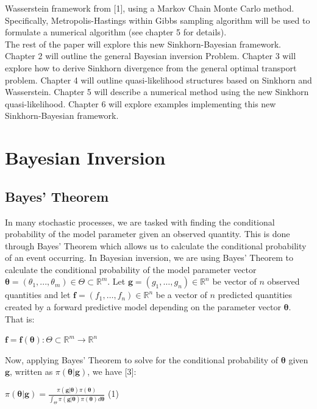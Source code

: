 \documentclass[botnum, fleqn]{unmeethesis}
\begin{document}
Wasserstein framework from [1], using a Markov Chain Monte Carlo method. Specifically, Metropolis-Hastings within Gibbs sampling algorithm will be used to formulate a numerical algorithm (see chapter 5 for details). \\
   The rest of the paper will explore this new Sinkhorn-Bayesian framework. Chapter 2 will outline the general Bayesian inversion Problem. Chapter 3 will explore how to derive Sinkhorn divergence from the general optimal transport problem. Chapter 4 will outline quasi-likelihood structures based on Sinkhorn and Wasserstein. Chapter 5 will describe a numerical method using the new Sinkhorn quasi-likelihood. Chapter 6 will explore examples implementing this new Sinkhorn-Bayesian framework. 
   

\chapter{Bayesian Inversion}
\section{\label{section:Bayes' Theorem}Bayes' Theorem}
In many stochastic processes, we are tasked with finding the conditional probability of the model parameter given an observed quantity. This is done through Bayes’ Theorem which allows us to calculate the conditional probability of an event occurring. In Bayesian inversion, we are using Bayes’ Theorem to calculate the conditional probability of the model parameter vector $\bm{\theta} = (\theta_1, ..., \theta_m) \in \Theta \subset \mathbb{R}^m $. Let $\bm{g}=(g_1,…,g_n) \in \mathbb{R}^n$ be vector of $n$ observed quantities and let $\bm{f}=(f_1,…,f_n) \in \mathbb{R}^n$ be a vector of $n$ predicted quantities created by a forward predictive model depending on the parameter vector $\bm{\theta}$. That is: 
\begin{center}
$\bm{f}=\bm{f}(\bm{\theta}): \Theta \subset \mathbb{R}^m \rightarrow \mathbb{R}^n$ 
\end{center}
Now, applying Bayes’ Theorem to solve for the conditional probability of $\bm{\theta}$ given $\bm{g}$, written as $\pi(\bm{\theta}|\bm{g})$, we have [3]:


	\hspace{\fill}$\pi(\bm{\theta}|\bm{g})=$\Large$\frac{\pi(\bm{g}|\bm{\theta})\pi(\bm{\theta})}{\int_{\Theta}\pi(\bm{g}|\bm{\theta})\pi(\bm{\theta})d\bm{\theta}}$ \hspace{\fill} \normalsize (1) 
\end{document}
